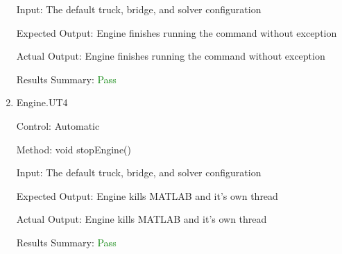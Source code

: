 \documentclass[12pt, titlepage]{article}
\begin{document}
\begin{enumerate}
  Input: The default truck, bridge, and solver configuration

  Expected Output: Engine finishes running the command without exception

  Actual Output: Engine finishes running the command without exception

  Results Summary: \textcolor{green} {Pass}

  \item {Engine.UT4}

  Control: Automatic

  Method: void stopEngine()

  Input: The default truck, bridge, and solver configuration

  Expected Output: Engine kills MATLAB and it's own thread

  Actual Output: Engine kills MATLAB and it's own thread

  Results Summary: \textcolor{green} {Pass}

\end{enumerate}
\end{document}
